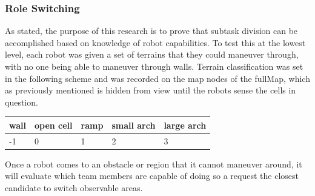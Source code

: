 \subsubsection{Role Switching}

As stated, the purpose of this research is to prove that subtask division can
be accomplished based on knowledge of robot capabilities. To test this at the
lowest level, each robot was given a set of terrains that they could maneuver through,
with no one being able to maneuver through walls. Terrain classification was set
in the following scheme and was recorded on the map nodes of the fullMap, which as
previously mentioned is hidden from view until the robots sense the cells in question.

\begin{tabularx}{\textwidth}{ |X|X|X|X|X| }
  \hline
  wall & open cell & ramp & small arch & large arch\\
  \hline
  -1  &  0  & 1  & 2 & 3 \\
  \hline
\end{tabularx}

Once a robot comes to an obstacle or region that it cannot maneuver around,
it will evaluate which team members are capable of doing so a request the
closest candidate to switch observable areas.
